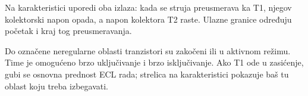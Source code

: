 Na karakteristici uporedi oba izlaza: kada se struja preusmerava ka T1, njegov kolektorski napon opada, a napon kolektora T2 raste. Ulazne granice određuju početak i kraj tog preusmeravanja.

Do označene neregularne oblasti tranzistori su zakočeni ili u aktivnom režimu. Time je omogućeno brzo uključivanje i brzo isključivanje. Ako T1 ode u zasićenje, gubi se osnovna prednost ECL rada; strelica na karakteristici pokazuje baš tu oblast koju treba izbegavati.

